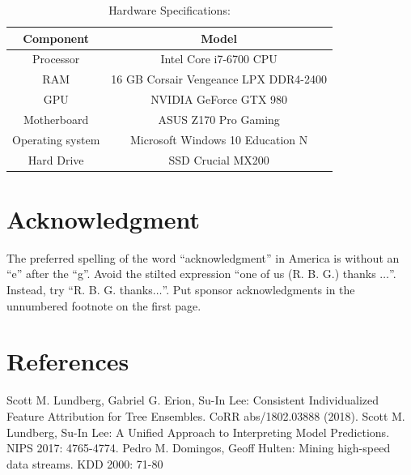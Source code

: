 \documentclass[conference]{IEEEtran}
\begin{document}
\begin{table}[htbp]
\caption{Hardware Specifications:}
\begin{center}
\begin{tabular}{|c|c|}
	\hline
	\textbf{Component} & \textbf{Model} \\
	\hline
	Processor & Intel Core i7-6700 CPU\\ \hline
	RAM & 16 GB Corsair Vengeance LPX DDR4-2400\\ \hline
	GPU & NVIDIA GeForce GTX 980 \\ \hline
	Motherboard & ASUS Z170 Pro Gaming \\ \hline
	Operating system & Microsoft Windows 10 Education N \\ \hline
	Hard Drive & SSD Crucial MX200 \\ \hline
\end{tabular}
\label{hardware}
\end{center}
\end{table}





\section*{Acknowledgment}

The preferred spelling of the word ``acknowledgment'' in America is without 
an ``e'' after the ``g''. Avoid the stilted expression ``one of us (R. B. 
G.) thanks $\ldots$''. Instead, try ``R. B. G. thanks$\ldots$''. Put sponsor 
acknowledgments in the unnumbered footnote on the first page.

\section*{References}

\begin{thebibliography}{00}
 Scott M. Lundberg, Gabriel G. Erion, Su-In Lee:
Consistent Individualized Feature Attribution for Tree Ensembles. CoRR abs/1802.03888 (2018).
 Scott M. Lundberg, Su-In Lee: A Unified Approach to Interpreting Model Predictions. NIPS 2017: 4765-4774.
 Pedro M. Domingos, Geoff Hulten: Mining high-speed data streams. KDD 2000: 71-80
\end{thebibliography}
\end{document}
